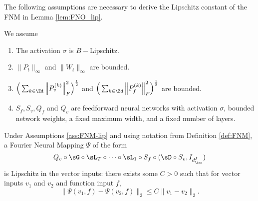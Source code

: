 \documentclass[letterpaper,11pt]{article}
\begin{document}
The following assumptions are necessary to derive the Lipschitz constant of the FNM in Lemma \ref{lem:FNO_lip}. 
\begin{assumptions} \label{ass:FNM-lip}
    We assume 
    \begin{enumerate}
        \item The activation $\sigma$ is $B-$Lipschitz.
        \item $\|P_t\|_{\infty}$ and $ \|W_t\|_{\infty}$ are bounded.
        \item $\Big(\sum_{k \in \Zd}\Big\|P_v^{(k)}\Big\|_F^2\Big)^\frac{1}{2}$ and $\Big(\sum_{k \in \Zd}\Big\|P_f^{(k)}\Big\|_F^2\Big)^\frac{1}{2}$ are bounded.
        \item $S_f, S_v, Q_f$ and $Q_v$ are feedforward neural networks with activation $\sigma$, bounded network weights, a fixed maximum width, and a fixed number of layers.
    \end{enumerate}
\end{assumptions}
\begin{lemma}\label{lem:FNO_lip}
   Under Assumptions \ref{ass:FNM-lip} and using notation from Definition \ref{def:FNM}, a Fourier Neural Mapping $\Psi$ of the form \[ Q_v \circ \sG \circ \sL_T \circ \dots \circ \sL_1 \circ S_f \circ (\sD \circ S_v, I_{d_{\inn}^f}) \]is Lipschitz in the vector inputs: there exists some $C>0$ such that for vector inputs $v_1$ and $v_2$ and function input $f$, 
   \begin{equation*}
       \|\Psi(v_1, f) - \Psi(v_2, f)\|_2 \leq C \|v_1 - v_2\|_2. 
   \end{equation*}
\end{lemma}
\end{document}
